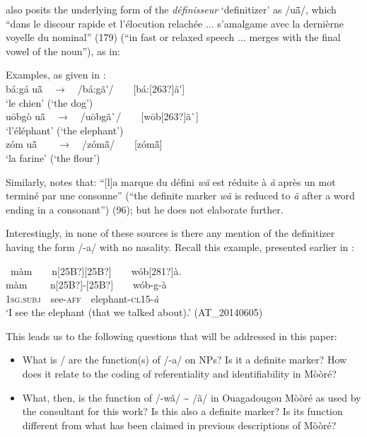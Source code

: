 \documentclass[output=paper]{langsci/langscibook}
\begin{document}
\cite{Canu1973} also posits the underlying form of the \textit{définisseur }‘definitizer’ as /u\~{a}\={ }/, which “dans le discour rapide et l’élocution relachée ... s’amalgame avec la dernièrne voyelle du nominal” (179) (“in fast or relaxed speech ... merges with the final vowel of the noun”), as in:

\ea\label{ex:teo:12}
Examples, as given in \citet[179]{Canu1973}:\\
b\'{a}:g\'{a} u\~{a}\={ }\ \ \textup{${\rightarrow}$}\textup{\ \ /b\'{a}:g\~{a}\'{ }/\ \ \ \ [b\'{a}:[263?]\~{a}\'{ }]}\ \ \\
‘le chien’ (‘the dog’)\\

u\={o}bg\`{o} u\~{a}\={ }\ \ \textup{${\rightarrow}$}\textup{\ \ /u\={o}bg\~{a}\`{ }/\ \ \ \ [w\={o}b[263?]\~{a}\`{ }]}\ \ \\
‘l’\'{e}l\'{e}phant’ (‘the elephant’)\\

z\'{o}m u\~{a}\={ }\ \ \ \ \textup{${\rightarrow}$}\textup{\ \ /z\'{o}m\~{a}\={ }/\ \ \ \ [z\'{o}m\~{a}\={ }]}\ \ \\
‘la farine’ (‘the flour’)
\z

Similarly, \cite{Nikiema1989} notes that: “[l]a marque du défini \textit{wã} est réduite à \textit{ã} après un mot terminé par une consonne” (“the definite marker \textit{wã} is reduced to \textit{ã} after a word ending in a consonant”) (96); but he does not elaborate further.

Interestingly, in none of these sources is there any mention of the definitizer having the form /\nobreakdash-a/ with no nasality. Recall this example, presented earlier in :

\ea\label{ex:teo:4repeated}
\ m\`{a}m\ \ \ \ n[25B?][25B?]\ \ \ \ w\'{o}b[281?]\`{a}.\\
\gll m\`{a}m \ \ \ \ n[25B?]\nobreakdash-[25B?]\ \ \ \ w\'{o}b-g\nobreakdash-\`{a}\\
\textsc{1sg.subj\ \ }see-\textsc{aff}\ \ elephant-\textsc{cl15-}\textit{\`{a}}\ \ \\
\glt ‘I see the elephant (that we talked about).’ (AT\_20140605)
\z

This leads us to the following questions that will be addressed in this paper:
 
\begin{itemize}
	\item What is / are the function(s) of /\nobreakdash-a/ on NPs? Is it a definite marker? How does it relate to the coding of referentiality and identifiability in Mòòré?
\item What, then, is the function of /-wã/ \~{} /ã/ in Ouagadougou M\`{o}\`{o}r\'{e} as used by the consultant for this work? Is this also a definite marker? Is its function different from what has been claimed in previous descriptions of M\`{o}\`{o}r\'{e}?
\end{itemize}
\end{document}
